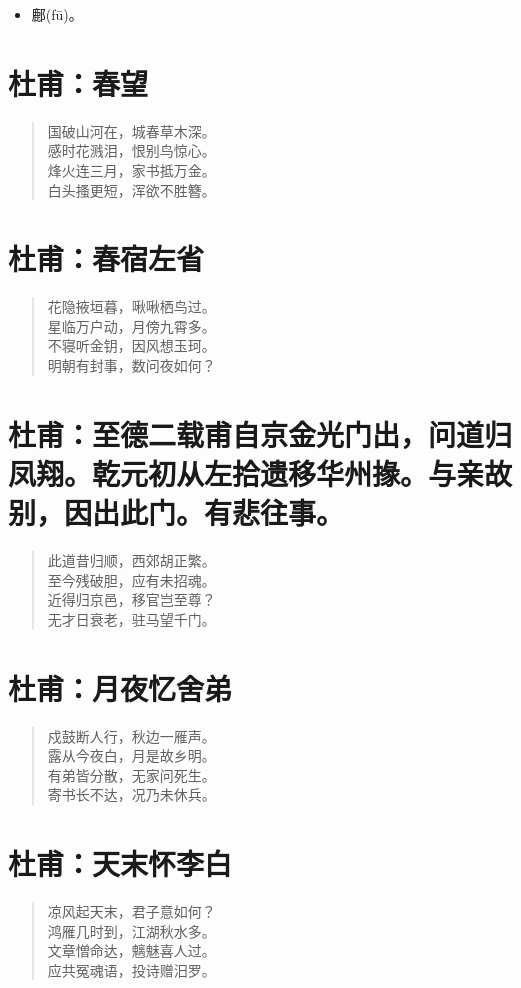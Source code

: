 \documentclass[12pt,oneside]{book}
\newenvironment{shici}{
\begin{verse}
\centering\large\hspace{12pt}}
{\end{verse}}
\begin{document}
\begin{itemize}
\item 鄜(fū)。
\end{itemize}

\chapter{杜甫：春望}
\begin{shici}
国破山河在，城春草木深。\\
感时花溅泪，恨别鸟惊心。\\
烽火连三月，家书抵万金。\\
白头搔更短，浑欲不胜簪。
\end{shici}

\chapter{杜甫：春宿左省}
\begin{shici}
花隐掖垣暮，啾啾栖鸟过。\\
星临万户动，月傍九霄多。\\
不寝听金钥，因风想玉珂。\\
明朝有封事，数问夜如何？
\end{shici}

\chapter{杜甫：至德二载甫自京金光门出，问道归凤翔。乾元初从左拾遗移华州掾。与亲故别，因出此门。有悲往事。}

\begin{shici}
此道昔归顺，西郊胡正繁。\\
至今残破胆，应有未招魂。\\
近得归京邑，移官岂至尊？\\
无才日衰老，驻马望千门。
\end{shici}


\chapter{杜甫：月夜忆舍弟}
\begin{shici}
戍鼓断人行，秋边一雁声。\\
露从今夜白，月是故乡明。\\
有弟皆分散，无家问死生。\\
寄书长不达，况乃未休兵。
\end{shici}

\chapter{杜甫：天末怀李白}
\begin{shici}
凉风起天末，君子意如何？\\
鸿雁几时到，江湖秋水多。\\
文章憎命达，魑魅喜人过。\\
应共冤魂语，投诗赠汨罗。
\end{shici}
\end{document}
